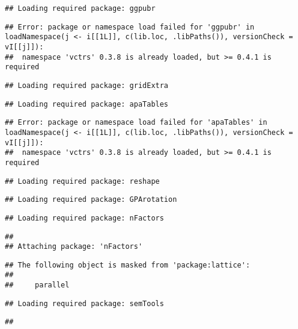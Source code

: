 \documentclass[
]{article}
\begin{document}
\begin{verbatim}
## Loading required package: ggpubr
\end{verbatim}

\begin{verbatim}
## Error: package or namespace load failed for 'ggpubr' in loadNamespace(j <- i[[1L]], c(lib.loc, .libPaths()), versionCheck = vI[[j]]):
##  namespace 'vctrs' 0.3.8 is already loaded, but >= 0.4.1 is required
\end{verbatim}

\begin{verbatim}
## Loading required package: gridExtra
\end{verbatim}

\begin{verbatim}
## Loading required package: apaTables
\end{verbatim}

\begin{verbatim}
## Error: package or namespace load failed for 'apaTables' in loadNamespace(j <- i[[1L]], c(lib.loc, .libPaths()), versionCheck = vI[[j]]):
##  namespace 'vctrs' 0.3.8 is already loaded, but >= 0.4.1 is required
\end{verbatim}

\begin{verbatim}
## Loading required package: reshape
\end{verbatim}

\begin{verbatim}
## Loading required package: GPArotation
\end{verbatim}

\begin{verbatim}
## Loading required package: nFactors
\end{verbatim}

\begin{verbatim}
## 
## Attaching package: 'nFactors'
\end{verbatim}

\begin{verbatim}
## The following object is masked from 'package:lattice':
## 
##     parallel
\end{verbatim}

\begin{verbatim}
## Loading required package: semTools
\end{verbatim}

\begin{verbatim}
## 
\end{verbatim}
\end{document}
